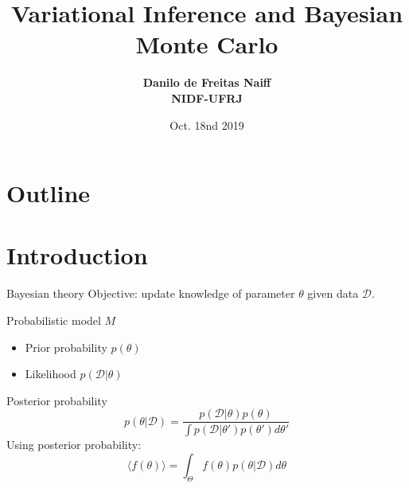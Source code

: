 \documentclass{beamer}
\title{Variational Inference and Bayesian Monte Carlo}
\author[Danilo Naiff]{{{\bf \large Danilo de Freitas Naiff} \vspace{0.75cm} \\{\bf NIDF-UFRJ}} \\ \vspace{0.8cm}}
\date{Oct. 18nd 2019}
\begin{document}
	\frame{\titlepage}


\section*{Outline}
\begin{frame}{}\tableofcontents
\end{frame}

\section{Introduction}

\begin{frame}{}
\begin{block}{Bayesian theory}
Objective: update knowledge of parameter $\theta$ given data $\mathcal{D}$.
\pause

Probabilistic model $M$
\begin{itemize}
\item Prior probability $p(\theta)$
\item Likelihood $p(\mathcal{D}|\theta)$
\end{itemize}
\pause
Posterior probability
\begin{equation*}
p(\mathcal{\theta}|\mathcal{D}) = \frac{p(\mathcal{D}|\theta) p(\theta)}{\int p(\mathcal{D}|\theta') p(\theta') d \theta'}
\end{equation*}
\pause
Using posterior probability:
\begin{equation*}
\langle f(\theta) \rangle = \int_\Theta f(\theta) p(\theta|\mathcal{D}) d \theta
\end{equation*}
\end{block}
\end{frame}
\end{document}
